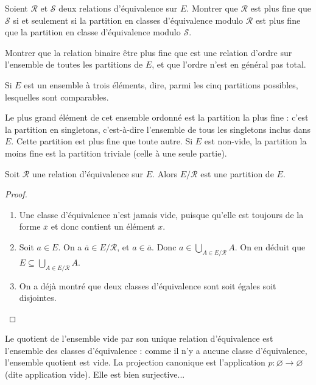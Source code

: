 \begin{exercice}
Soient $\mathcal R$ et $\mathcal S$ deux relations d'équivalence sur $E$. Montrer que $\mathcal R$ est plus fine que $\mathcal S$ si et seulement si la partition en classes d'équivalence modulo $\mathcal R$ est plus fine que la partition en classe d'équivalence modulo $\mathcal S$.
\end{exercice}

\begin{exercice}
Montrer que la relation binaire \og être plus fine que\fg{} est une relation d'ordre sur l'ensemble de toutes les partitions de $E$, et que l'ordre n'est en général pas total.

Si $E$ est un ensemble à trois éléments, dire, parmi les cinq partitions possibles, lesquelles sont comparables.
\end{exercice}


\begin{remarque}
Le plus grand élément de cet ensemble ordonné est la partition la  plus fine : c'est la partition en singletons, c'est-à-dire l'ensemble de tous les singletons inclus dans $E$. Cette partition est plus fine que toute autre. Si $E$ est non-vide, la partition la moins fine est la partition triviale (celle à une seule partie).  
\end{remarque}



\begin{proposition}
Soit $\mathcal R$ une relation d'équivalence sur $E$. Alors $E/\mathcal R$ est une partition de $E$.
\end{proposition}
\begin{proof}
\begin{enumerate}
\item Une classe d'équivalence n'est jamais vide, puisque qu'elle est toujours de la forme $\overline{x}$ et donc contient un élément $x$.
\item Soit $a\in E$. On a $\overline{a} \in E/\mathcal R$, et $a\in \overline{a}$. Donc $a\in \bigcup_{A\in E/\mathcal R} A$. On en déduit que $E\subseteq \bigcup_{A\in E/\mathcal R} A$.
\item On a déjà montré que deux classes d'équivalence sont soit égales soit disjointes.
\end{enumerate}
\end{proof}

\begin{remarque}[Zérologie] Le quotient de l'ensemble vide par son unique relation d'équivalence est l'ensemble des classes d'équivalence : comme il n'y a aucune classe d'équivalence, l'ensemble quotient est vide. La projection canonique est l'application $p : \varnothing \to \varnothing$ (dite application vide). Elle est bien surjective...
\end{remarque}

